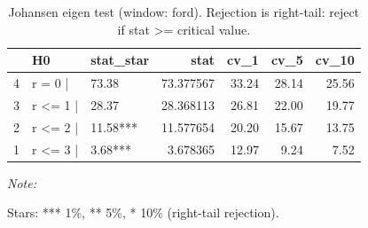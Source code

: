 \begin{table}[!h]
\centering
\caption{Johansen eigen test (window: ford). Rejection is right-tail: reject if stat >= critical value.}
\centering
\begin{threeparttable}
\begin{tabular}[t]{lllrrrr}
\toprule
  & H0 & stat\_star & stat & cv\_1 & cv\_5 & cv\_10\\
\midrule
4 & r = 0  | & 73.38 & 73.377567 & 33.24 & 28.14 & 25.56\\
3 & r <= 1 | & 28.37 & 28.368113 & 26.81 & 22.00 & 19.77\\
2 & r <= 2 | & 11.58*** & 11.577654 & 20.20 & 15.67 & 13.75\\
1 & r <= 3 | & 3.68*** & 3.678365 & 12.97 & 9.24 & 7.52\\
\bottomrule
\end{tabular}
\begin{tablenotes}
\item \textit{Note: } 
\item Stars: *** 1\%, ** 5\%, * 10\% (right-tail rejection).
\end{tablenotes}
\end{threeparttable}
\end{table}
